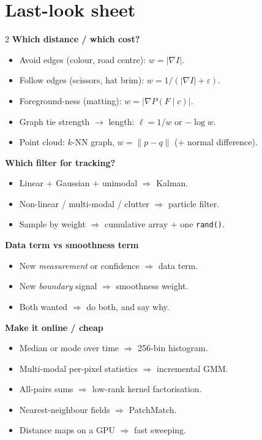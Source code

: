 \documentclass[9pt,a4paper]{extarticle}
\begin{document}
\section{Last-look sheet}

\begin{multicols}{2}
\textbf{Which distance / which cost?}
\begin{itemize}
  \item Avoid edges (colour, road centre): $w=|\nabla I|$.
  \item Follow edges (scissors, hat brim): $w=1/(|\nabla I|+\varepsilon)$.
  \item Foreground-ness (matting): $w=|\nabla P(F\mid c)|$.
  \item Graph tie strength $\to$ length: $\ell=1/w$ or $-\log w$.
  \item Point cloud: $k$-NN graph, $w=\|p-q\|$ ($+$ normal difference).
\end{itemize}

\textbf{Which filter for tracking?}
\begin{itemize}
  \item Linear $+$ Gaussian $+$ unimodal $\Rightarrow$ Kalman.
  \item Non-linear / multi-modal / clutter $\Rightarrow$ particle filter.
  \item Sample by weight $\Rightarrow$ cumulative array $+$ one \texttt{rand()}.
\end{itemize}

\textbf{Data term vs smoothness term}
\begin{itemize}
  \item New \emph{measurement} or confidence $\Rightarrow$ data term.
  \item New \emph{boundary} signal $\Rightarrow$ smoothness weight.
  \item Both wanted $\Rightarrow$ do both, and say why.
\end{itemize}

\textbf{Make it online / cheap}
\begin{itemize}
  \item Median or mode over time $\Rightarrow$ 256-bin histogram.
  \item Multi-modal per-pixel statistics $\Rightarrow$ incremental GMM.
  \item All-pairs sums $\Rightarrow$ low-rank kernel factorisation.
  \item Nearest-neighbour fields $\Rightarrow$ PatchMatch.
  \item Distance maps on a GPU $\Rightarrow$ fast sweeping.
\end{itemize}


\end{multicols}
\end{document}
